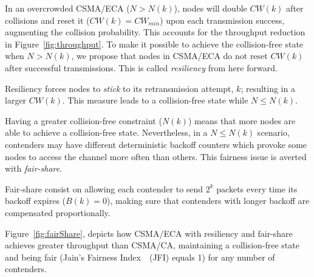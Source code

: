 In an overcrowded CSMA/ECA ($N>N(k)$), nodes will double $CW(k)$ after collisions and reset it ($CW(k)=CW_{min}$) upon each transmission success, augmenting the collision probability. This accounts for the throughput reduction in Figure~\ref{fig:throughput}. To make it possible to achieve the collision-free state when $N>N(k)$, we propose that nodes in CSMA/ECA do not reset $CW(k)$ after successful transmissions. This is called \emph{resiliency} from here forward.

Resiliency forces nodes to \emph{stick} to its retransmission attempt, $k$; resulting in a larger $CW(k)$. This measure leads to a collision-free state while $N\leq N(k)$.

Having a greater collision-free constraint ($N(k)$) means that more nodes are able to achieve a collision-free state. Nevertheless, in a $N\leq N(k)$ scenario, contenders may have different deterministic backoff counters which provoke some nodes to access the channel more often than others. This fairness issue is averted with \emph{fair-share}.

Fair-share consist on allowing each contender to send $2^{k}$ packets every time its backoff expires ($B(k)=0$), making sure that contenders with longer backoff are compensated proportionally.

Figure~\ref{fig:fairShare}, depicts how CSMA/ECA with resiliency and fair-share achieves greater throughput than CSMA/CA, maintaining a collision-free state and being fair (Jain's Fairness Index~\cite{JFI}~(JFI) equals 1) for any number of contenders.



